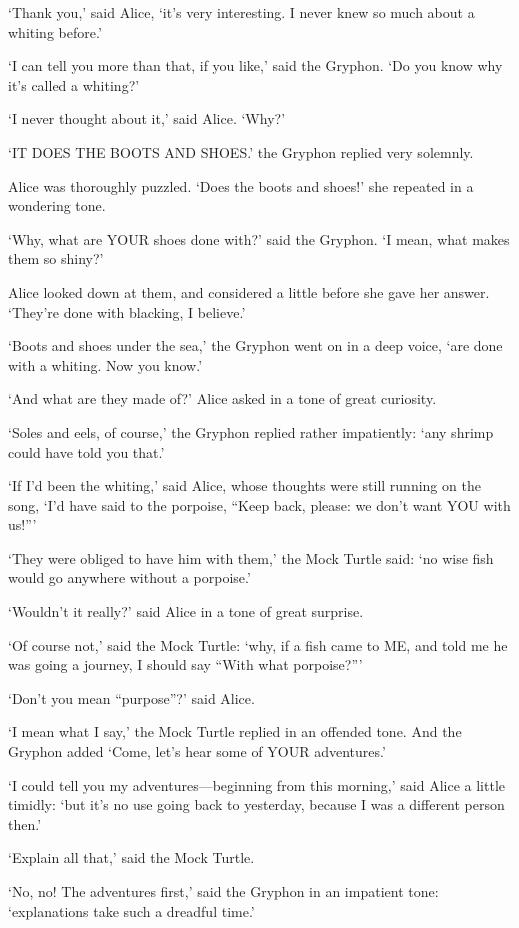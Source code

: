 \documentclass[12pt]{book}
\begin{document}
\begin{Parallel}[p]{}{}
{‘Thank you,’ said Alice, ‘it’s very interesting. I never knew so much about a whiting before.’

‘I can tell you more than that, if you like,’ said the Gryphon. ‘Do you know why it’s called a whiting?’

‘I never thought about it,’ said Alice. ‘Why?’

‘IT DOES THE BOOTS AND SHOES.’ the Gryphon replied very solemnly.

Alice was thoroughly puzzled. ‘Does the boots and shoes!’ she repeated in a wondering tone.

‘Why, what are YOUR shoes done with?’ said the Gryphon. ‘I mean, what makes them so shiny?’

Alice looked down at them, and considered a little before she gave her answer. ‘They’re done with blacking, I believe.’

‘Boots and shoes under the sea,’ the Gryphon went on in a deep voice, ‘are done with a whiting. Now you know.’

‘And what are they made of?’ Alice asked in a tone of great curiosity.

‘Soles and eels, of course,’ the Gryphon replied rather impatiently: ‘any shrimp could have told you that.’

‘If I’d been the whiting,’ said Alice, whose thoughts were still running on the song, ‘I’d have said to the porpoise, “Keep back, please: we don’t want YOU with us!”’

‘They were obliged to have him with them,’ the Mock Turtle said: ‘no wise fish would go anywhere without a porpoise.’

‘Wouldn’t it really?’ said Alice in a tone of great surprise.

‘Of course not,’ said the Mock Turtle: ‘why, if a fish came to ME, and told me he was going a journey, I should say “With what porpoise?”’

‘Don’t you mean “purpose”?’ said Alice.

‘I mean what I say,’ the Mock Turtle replied in an offended tone. And the Gryphon added ‘Come, let’s hear some of YOUR adventures.’

‘I could tell you my adventures—beginning from this morning,’ said Alice a little timidly: ‘but it’s no use going back to yesterday, because I was a different person then.’

‘Explain all that,’ said the Mock Turtle.

‘No, no! The adventures first,’ said the Gryphon in an impatient tone: ‘explanations take such a dreadful time.’

}
\end{Parallel}
\end{document}
